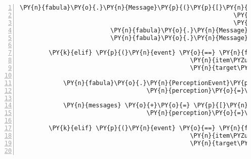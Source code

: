 \begin{Verbatim}[commandchars=\\\{\},numbers=left,firstnumber=1,stepnumber=1]
                         \PY{n}{fabula}\PY{o}{.}\PY{n}{Message}\PY{p}{(}\PY{p}{[}\PY{n}{fabula}\PY{o}{.}\PY{n}{DropsEvent}\PY{p}{(}\PY{n}{ID\PYZus{}KUNI}\PY{p}{,}
                                                           \PY{n+nb+bp}{self}\PY{o}{.}\PY{n}{host}\PY{o}{.}\PY{n}{rack}\PY{o}{.}\PY{n}{entity\PYZus{}dict}\PY{p}{[}\PY{l+s}{\PYZsq{}}\PY{l+s}{key}\PY{l+s}{\PYZsq{}}\PY{p}{]}\PY{p}{,}
                                                           \PY{n}{room}\PY{o}{.}\PY{n}{entity\PYZus{}locations}\PY{p}{[}\PY{l+s}{\PYZsq{}}\PY{l+s}{door}\PY{l+s}{\PYZsq{}}\PY{p}{]}\PY{p}{)}\PY{p}{]}\PY{p}{)}\PY{p}{,}
                         \PY{n}{fabula}\PY{o}{.}\PY{n}{Message}\PY{p}{(}\PY{p}{[}\PY{n}{fabula}\PY{o}{.}\PY{n}{DeleteEvent}\PY{p}{(}\PY{n}{identifier}\PY{o}{=}\PY{l+s}{\PYZsq{}}\PY{l+s}{key}\PY{l+s}{\PYZsq{}}\PY{p}{)}\PY{p}{]}\PY{p}{)}\PY{p}{,}
                         \PY{n}{fabula}\PY{o}{.}\PY{n}{Message}\PY{p}{(}\PY{p}{[}\PY{n}{fabula}\PY{o}{.}\PY{n}{DeleteEvent}\PY{p}{(}\PY{n}{identifier}\PY{o}{=}\PY{l+s}{\PYZsq{}}\PY{l+s}{door}\PY{l+s}{\PYZsq{}}\PY{p}{)}\PY{p}{]}\PY{p}{)}\PY{p}{]}

        \PY{k}{elif} \PY{p}{(}\PY{n}{event} \PY{o}{==} \PY{n}{fabula}\PY{o}{.}\PY{n}{TriesToDropEvent}\PY{p}{(}\PY{n}{identifier}\PY{o}{=}\PY{n}{ID\PYZus{}KUNI}\PY{p}{,}
                                               \PY{n}{item\PYZus{}identifier}\PY{o}{=}\PY{l+s}{\PYZsq{}}\PY{l+s}{key}\PY{l+s}{\PYZsq{}}\PY{p}{,}
                                               \PY{n}{target\PYZus{}identifier}\PY{o}{=}\PY{n}{ID\PYZus{}CASSANDRA}\PY{p}{)}\PY{p}{)}\PY{p}{:}

            \PY{n}{fabula}\PY{o}{.}\PY{n}{PerceptionEvent}\PY{p}{(}\PY{n}{identifier}\PY{o}{=}\PY{n}{ID\PYZus{}KUNI}\PY{p}{,}
                                   \PY{n}{perception}\PY{o}{=}\PY{l+s}{\PYZsq{}}\PY{l+s}{Cassandra hat den Schlüssel gesehen.}\PY{l+s}{\PYZsq{}}\PY{p}{)}

            \PY{n}{messages} \PY{o}{+}\PY{o}{=} \PY{p}{[}\PY{n}{fabula}\PY{o}{.}\PY{n}{Message}\PY{p}{(}\PY{p}{[}\PY{n}{fabula}\PY{o}{.}\PY{n}{PerceptionEvent}\PY{p}{(}\PY{n}{identifier}\PY{o}{=}\PY{n}{ID\PYZus{}CASSANDRA}\PY{p}{,}
                                   \PY{n}{perception}\PY{o}{=}\PY{l+s}{\PYZsq{}}\PY{l+s}{Kuni hat einen Schlüssel.}\PY{l+s}{\PYZsq{}}\PY{p}{)}\PY{p}{]}\PY{p}{)}\PY{p}{]}

        \PY{k}{elif} \PY{p}{(}\PY{n}{event} \PY{o}{==} \PY{n}{fabula}\PY{o}{.}\PY{n}{TriesToDropEvent}\PY{p}{(}\PY{n}{identifier}\PY{o}{=}\PY{n}{ID\PYZus{}KUNI}\PY{p}{,}
                                               \PY{n}{item\PYZus{}identifier}\PY{o}{=}\PY{l+s}{\PYZsq{}}\PY{l+s}{key}\PY{l+s}{\PYZsq{}}\PY{p}{,}
                                               \PY{n}{target\PYZus{}identifier}\PY{o}{=}\PY{l+s}{\PYZsq{}}\PY{l+s}{spider}\PY{l+s}{\PYZsq{}}\PY{p}{)}\PY{p}{)}\PY{p}{:}


\end{Verbatim}
